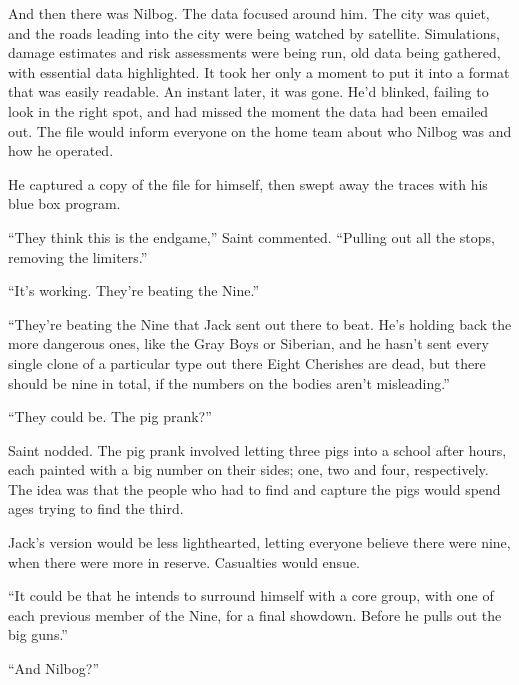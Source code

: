And then there was Nilbog.  The data focused around him.  The city was quiet, and the roads leading into the city were being watched by satellite.  Simulations, damage estimates and risk assessments were being run, old data being gathered, with essential data highlighted.  It took her only a moment to put it into a format that was easily readable.  An instant later, it was gone.  He'd blinked, failing to look in the right spot, and had missed the moment the data had been emailed out.  The file would inform everyone on the home team about who Nilbog was and how he operated.



He captured a copy of the file for himself, then swept away the traces with his blue box program.



``They think this is the endgame,'' Saint commented.  ``Pulling out all the stops, removing the limiters.''



``It's working.  They're beating the Nine.''



``They're beating the Nine that Jack sent out there to beat.  He's holding back the more dangerous ones, like the Gray Boys or Siberian, and he hasn't sent every single clone of a particular type out there  Eight Cherishes are dead, but there should be nine in total, if the numbers on the bodies aren't misleading.''



``They could be.  The pig prank?''



Saint nodded.  The pig prank involved letting three pigs into a school after hours, each painted with a big number on their sides; one, two and four, respectively.  The idea was that the people who had to find and capture the pigs would spend ages trying to find the third.



Jack's version would be less lighthearted, letting everyone believe there were nine, when there were more in reserve.  Casualties would ensue.



``It could be that he intends to surround himself with a core group, with one of each previous member of the Nine, for a final showdown.  Before he pulls out the big guns.''



``And Nilbog?''



